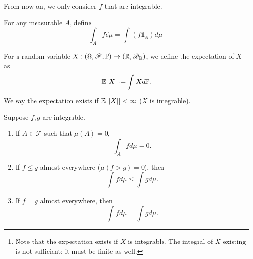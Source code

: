 From now on, we only consider $f$ that are integrable.

\begin{definition}
	For any measurable $A$, define \[
		\int_{A}^{} fd\mu = \int_{}^{} \left( f \mathds{1}_{A} \right)d\mu  
	.\] 
\end{definition}

\begin{definition}
	For a random variable $X: \left( \Omega, \mathscr{F}, \mathbb{P} \right) \to \left( \mathbb{R}, \mathscr{B}_{\mathbb{R}} \right)$, we define the expectation of $X$ as \[
		\mathbb{E}\left[X\right] \coloneqq \int_{}^{} X d\mathbb{P} 
	.\] We say the expectation exists if $\mathbb{E}\left[\left| X \right|\right] < \infty$ ($X$ is integrable).\footnote{Note that the expectation exists if $X$ is integrable. The integral of $X$ existing is not sufficient; it must be finite as well.}
\end{definition}

\begin{lemma}
	Suppose $f,g$ are integrable. 
	\begin{enumerate}[label=(\roman*)]
		\item If $A \in \mathscr{F}$ such that $\mu(A) = 0$, \[
			\int_{A}^{} fd\mu = 0 
		.\] 
		\item If $f \le g$ almost everywhere ($\mu(f > g) = 0$), then \[
			\int_{}^{}  fd\mu \le \int_{}^{} g d\mu 
		.\] 
		\item If $f= g$ almost everywhere, then \[
			\int_{}^{} fd\mu = \int_{}^{} gd\mu  
		.\] 
	\end{enumerate}
\end{lemma}

